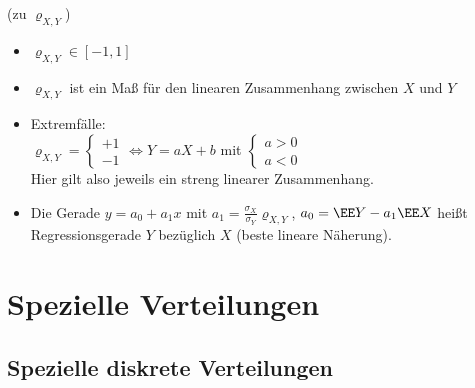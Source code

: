  (zu $\varrho_{X,Y}$)
\begin{itemize}
\item $\varrho_{X,Y} \in [-1,1]$
\item $\varrho_{X,Y}$ ist ein Maß für den linearen Zusammenhang zwischen $X$ und $Y$
\item Extremfälle:\\
$\varrho_{X,Y}=\begin{cases}
+1\\
-1
\end{cases} \Leftrightarrow Y=aX+b$ mit $\begin{cases}
a > 0\\
a < 0
\end{cases}$\\
Hier gilt also jeweils ein streng linearer Zusammenhang.
\item Die Gerade $y=a_0+a_1 x$ mit $a_1 = \frac{\sigma_X}{\sigma_Y}\varrho_{X,Y}$, $a_0=\EE Y - a_1 \EE  X$ heißt Regressionsgerade $Y$ bezüglich $X$ (beste lineare Näherung).
\end{itemize} 

\section{Spezielle Verteilungen}
\subsection{Spezielle diskrete Verteilungen}
